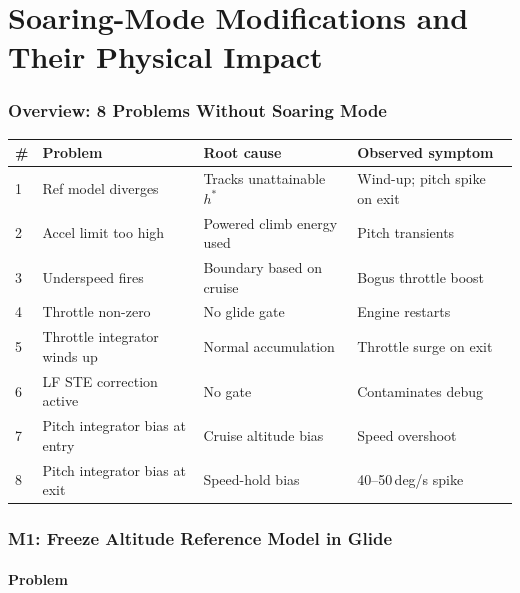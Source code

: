 \documentclass[12pt,a4paper]{article}
\begin{document}
\part{Soaring-Mode Modifications and Their Physical Impact}

\section{Overview: 8 Problems Without Soaring Mode}

\begin{center}
\renewcommand{\arraystretch}{1.2}
\begin{tabular}{p{0.3cm}p{4cm}p{3.8cm}p{4cm}}
\toprule
\# & Problem & Root cause & Observed symptom \\
\midrule
1 & Ref model diverges & Tracks unattainable $h^*$ & Wind-up; pitch spike on exit \\
2 & Accel limit too high & Powered climb energy used & Pitch transients \\
3 & Underspeed fires & Boundary based on cruise & Bogus throttle boost \\
4 & Throttle non-zero & No glide gate & Engine restarts \\
5 & Throttle integrator winds up & Normal accumulation & Throttle surge on exit \\
6 & LF STE correction active & No gate & Contaminates debug \\
7 & Pitch integrator bias at entry & Cruise altitude bias & Speed overshoot \\
8 & Pitch integrator bias at exit & Speed-hold bias & 40--50\,deg/s spike \\
\bottomrule
\end{tabular}
\end{center}

\section{M1: Freeze Altitude Reference Model in Glide}

\subsection{Problem}
\end{document}
